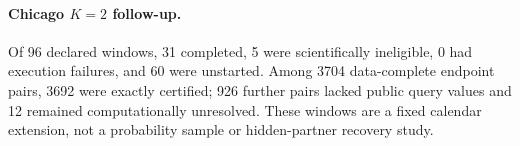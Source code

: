 \paragraph{Chicago $K=2$ follow-up.} Of 96 declared windows, 31 completed, 5 were scientifically ineligible, 0 had execution failures, and 60 were unstarted. Among 3704 data-complete endpoint pairs, 3692 were exactly certified; 926 further pairs lacked public query values and 12 remained computationally unresolved. These windows are a fixed calendar extension, not a probability sample or hidden-partner recovery study.

